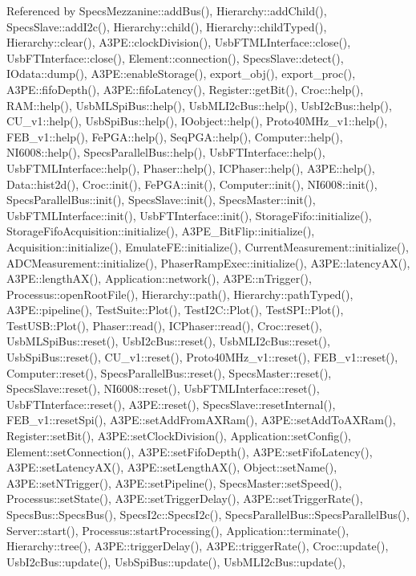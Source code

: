 Referenced by Specs\+Mezzanine\+::add\+Bus(), Hierarchy\+::add\+Child(), Specs\+Slave\+::add\+I2c(), Hierarchy\+::child(), Hierarchy\+::child\+Typed(), Hierarchy\+::clear(), A3\+P\+E\+::clock\+Division(), Usb\+F\+T\+M\+L\+Interface\+::close(), Usb\+F\+T\+Interface\+::close(), Element\+::connection(), Specs\+Slave\+::detect(), I\+Odata\+::dump(), A3\+P\+E\+::enable\+Storage(), export\+\_\+obj(), export\+\_\+proc(), A3\+P\+E\+::fifo\+Depth(), A3\+P\+E\+::fifo\+Latency(), Register\+::get\+Bit(), Croc\+::help(), R\+A\+M\+::help(), Usb\+M\+L\+Spi\+Bus\+::help(), Usb\+M\+L\+I2c\+Bus\+::help(), Usb\+I2c\+Bus\+::help(), C\+U\+\_\+v1\+::help(), Usb\+Spi\+Bus\+::help(), I\+Oobject\+::help(), Proto40\+M\+Hz\+\_\+v1\+::help(), F\+E\+B\+\_\+v1\+::help(), Fe\+P\+G\+A\+::help(), Seq\+P\+G\+A\+::help(), Computer\+::help(), N\+I6008\+::help(), Specs\+Parallel\+Bus\+::help(), Usb\+F\+T\+Interface\+::help(), Usb\+F\+T\+M\+L\+Interface\+::help(), Phaser\+::help(), I\+C\+Phaser\+::help(), A3\+P\+E\+::help(), Data\+::hist2d(), Croc\+::init(), Fe\+P\+G\+A\+::init(), Computer\+::init(), N\+I6008\+::init(), Specs\+Parallel\+Bus\+::init(), Specs\+Slave\+::init(), Specs\+Master\+::init(), Usb\+F\+T\+M\+L\+Interface\+::init(), Usb\+F\+T\+Interface\+::init(), Storage\+Fifo\+::initialize(), Storage\+Fifo\+Acquisition\+::initialize(), A3\+P\+E\+\_\+\+Bit\+Flip\+::initialize(), Acquisition\+::initialize(), Emulate\+F\+E\+::initialize(), Current\+Measurement\+::initialize(), A\+D\+C\+Measurement\+::initialize(), Phaser\+Ramp\+Exec\+::initialize(), A3\+P\+E\+::latency\+A\+X(), A3\+P\+E\+::length\+A\+X(), Application\+::network(), A3\+P\+E\+::n\+Trigger(), Processus\+::open\+Root\+File(), Hierarchy\+::path(), Hierarchy\+::path\+Typed(), A3\+P\+E\+::pipeline(), Test\+Suite\+::\+Plot(), Test\+I2\+C\+::\+Plot(), Test\+S\+P\+I\+::\+Plot(), Test\+U\+S\+B\+::\+Plot(), Phaser\+::read(), I\+C\+Phaser\+::read(), Croc\+::reset(), Usb\+M\+L\+Spi\+Bus\+::reset(), Usb\+I2c\+Bus\+::reset(), Usb\+M\+L\+I2c\+Bus\+::reset(), Usb\+Spi\+Bus\+::reset(), C\+U\+\_\+v1\+::reset(), Proto40\+M\+Hz\+\_\+v1\+::reset(), F\+E\+B\+\_\+v1\+::reset(), Computer\+::reset(), Specs\+Parallel\+Bus\+::reset(), Specs\+Master\+::reset(), Specs\+Slave\+::reset(), N\+I6008\+::reset(), Usb\+F\+T\+M\+L\+Interface\+::reset(), Usb\+F\+T\+Interface\+::reset(), A3\+P\+E\+::reset(), Specs\+Slave\+::reset\+Internal(), F\+E\+B\+\_\+v1\+::reset\+Spi(), A3\+P\+E\+::set\+Add\+From\+A\+X\+Ram(), A3\+P\+E\+::set\+Add\+To\+A\+X\+Ram(), Register\+::set\+Bit(), A3\+P\+E\+::set\+Clock\+Division(), Application\+::set\+Config(), Element\+::set\+Connection(), A3\+P\+E\+::set\+Fifo\+Depth(), A3\+P\+E\+::set\+Fifo\+Latency(), A3\+P\+E\+::set\+Latency\+A\+X(), A3\+P\+E\+::set\+Length\+A\+X(), Object\+::set\+Name(), A3\+P\+E\+::set\+N\+Trigger(), A3\+P\+E\+::set\+Pipeline(), Specs\+Master\+::set\+Speed(), Processus\+::set\+State(), A3\+P\+E\+::set\+Trigger\+Delay(), A3\+P\+E\+::set\+Trigger\+Rate(), Specs\+Bus\+::\+Specs\+Bus(), Specs\+I2c\+::\+Specs\+I2c(), Specs\+Parallel\+Bus\+::\+Specs\+Parallel\+Bus(), Server\+::start(), Processus\+::start\+Processing(), Application\+::terminate(), Hierarchy\+::tree(), A3\+P\+E\+::trigger\+Delay(), A3\+P\+E\+::trigger\+Rate(), Croc\+::update(), Usb\+I2c\+Bus\+::update(), Usb\+Spi\+Bus\+::update(), Usb\+M\+L\+I2c\+Bus\+::update(), 